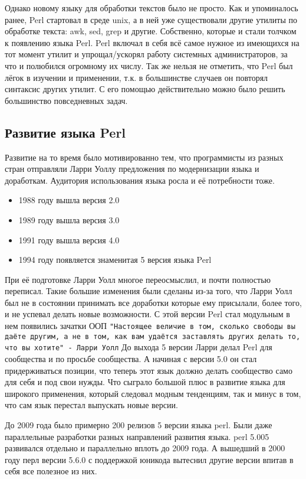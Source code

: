 Однако новому языку для обработки текстов было не просто. Как и упоминалось ранее, Perl стартовал в среде unix, а в ней уже существовали другие утилиты по обработке текста: awk, sed, grep и другие. Собственно, которые и стали толчком к появлению языка Perl. Perl включал в себя всё самое нужное из имеющихся на тот момент утилит и упрощал/ускорял работу системных администраторов, за что и полюбился огромному их числу.
Так же нельзя не отметить, что Perl был лёгок в изучении и применении, т.к. в большинстве случаев он повторял синтаксис других утилит. С его помощью действительно можно было решить большинство повседневных задач.

\subsection{Развитие языка Perl}
Развитие на то время было мотивированно тем, что программисты из разных стран отправляли Ларри Уоллу предложения по модернизации языка и доработкам. Аудитория использования языка росла и её потребности тоже. 
\begin{itemize}
 \item 1988 году вышла версия 2.0
 \item1989 году вышла версия 3.0
 \item1991 году вышла версия 4.0
 \item1994 году появляется знаменитая 5 версия языка Perl
\end{itemize}
При её подготовке Ларри Уолл многое переосмыслил, и почти полностью переписал. Такие большие изменения были сделаны из-за того, что Ларри Уолл был не в состоянии принимать все доработки которые ему присылали, более того, и не успевал делать новые возможности. С этой версии Perl стал модульным в нем появились зачатки ООП
\verb|"Настоящее величие в том, сколько свободы вы даёте другим, а не в том, как вам удаётся заставлять других делать то, что вы хотите" - Ларри Уолл|
До выхода 5 версии Ларри делал Perl для сообщества и по просьбе сообщества. А начиная с версии 5.0 он стал придерживаться позиции, что теперь этот язык должно делать сообщество само для себя и под свои нужды. Что сыграло большой плюс в развитие языка для широкого применения, который следовал модным тенденциям, так и минус в том, что сам язык перестал выпускать новые версии.

До 2009 года было примерно 200 релизов 5 версии языка perl. Были даже параллельные разработки разных направлений развития языка. perl 5.005 развивался отдельно и параллельно вплоть до 2009 года. 
А вышедший в 2000 году перл версии 5.6.0 с поддержкой юникода вытеснил другие версии впитав в себя все полезное из них.

